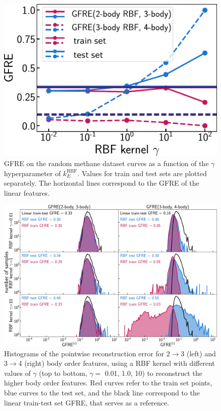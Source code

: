 \begin{figure}
    \centering
    \includegraphics[width=0.6\linewidth]{fig/rof/gamma_plot-methane-inkscaped-ver3-fixed_rkhs_features.pdf}
    \caption{GFRE on the random methane dataset curves as a function of the $\gamma$ hyperparameter of $k^{\text{RBF}}_E$.
    Values for train and test sets are plotted separately. The horizontal lines correspond to the GFRE of the linear features.}
    \label{fig:rbf-bo-promote}
\end{figure}

\begin{figure}
\includegraphics[width=0.9\linewidth]{fig/rof/ffre_kernel_train_test_hist-rs_ps-rbf-methane-inkscaped-ver2_fixed_rkhs_features.pdf}
\caption{Histograms of the pointwise reconstruction error for $2\rightarrow 3$ (left) and $3\rightarrow 4$ (right) body order features, using a RBF kernel with different values of $\gamma$ (top to bottom, $\gamma=$ 0.01, 1.0, 10) to reconstruct the higher body order features. Red curves refer to the train set points, blue curves to the test set, and the black line correspond to the linear train-test set GFRE, that serves as a reference.}
    \label{fig:rbf-body-hists}
\end{figure}



